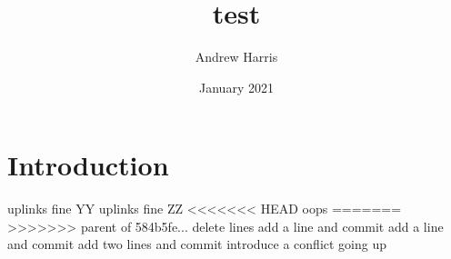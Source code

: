 \documentclass{article}
\title{test}
\author{Andrew Harris}
\date{January 2021}
\begin{document}
\maketitle

\section{Introduction}
uplinks fine YY
uplinks fine ZZ
<<<<<<< HEAD
oops
=======
>>>>>>> parent of 584b5fe... delete lines
add a line and commit
add a line and commit
add two lines and commit
introduce a conflict going up
\end{document}
